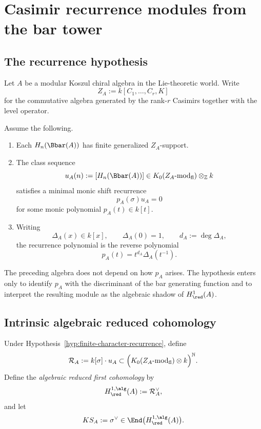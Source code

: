 \section{Casimir recurrence modules from the bar tower}

\subsection{The recurrence hypothesis}

Let \(A\) be a modular Koszul chiral algebra in the Lie-theoretic world.
Write
\[
Z_A:=k[C_1,\dots,C_r,K]
\]
for the commutative algebra generated by the rank-\(r\) Casimirs together with the level operator.

\begin{hypothesis}
\label{hyp:finite-character-recurrence}
Assume the following.

\begin{enumerate}[label=\textup{(\roman*)}]
\item Each \(H_n(\Bbar(A))\) has finite generalized \(Z_A\)-support.

\item The class sequence
\[
u_A(n):=[H_n(\Bbar(A))]\in K_0(Z_A\text{-mod}_{\mathrm{fl}})\otimes_{\mathbb Z} k
\]
satisfies a minimal monic shift recurrence
\[
p_A(\sigma)u_A=0
\]
for some monic polynomial \(p_A(t)\in k[t]\).

\item Writing
\[
\Delta_A(x)\in k[x],\qquad \Delta_A(0)=1,\qquad d_A:=\deg \Delta_A,
\]
the recurrence polynomial is the reverse polynomial
\[
p_A(t)=t^{d_A}\Delta_A(t^{-1}).
\]
\end{enumerate}
\end{hypothesis}

\begin{remark}
The preceding algebra does not depend on how \(p_A\) arises.
The hypothesis enters only to identify \(p_A\) with the discriminant of the bar generating function and to interpret the resulting module as the algebraic shadow of \(H^1_{\red}(A)\).
\end{remark}

\subsection{Intrinsic algebraic reduced cohomology}

\begin{definition}
Under Hypothesis~\ref{hyp:finite-character-recurrence}, define
\[
\mathcal R_A:=k[\sigma]\cdot u_A
\subset \Bigl(K_0(Z_A\text{-mod}_{\mathrm{fl}})\otimes k\Bigr)^{\mathbb N}.
\]
Define the \emph{algebraic reduced first cohomology} by
\[
H^{1,\alg}_{\red}(A):=\mathcal R_A^\vee,
\]
and let
\[
KS_A:=\sigma^\vee\in \End\bigl(H^{1,\alg}_{\red}(A)\bigr).
\]
\end{definition}

